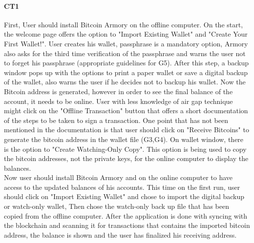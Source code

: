 \paragraph{CT1} 
First, User should install Bitcoin Armory on the offline computer. On the start, the welcome page offers the option to "Import Existing Wallet" and "Create Your First Wallet!". User creates his wallet, passphrase is a mandatory option, Armory also asks for the third time verification of the passphrase and warns the user not to forget his passphrase (appropriate guidelines for G5). After this step, a backup window pops up with the options to print a paper wallet or save a digital backup of the wallet, also warns the user if he decides not to backup his wallet. Now the Bitcoin address is generated, however in order to see the final balance of the account, it needs to be online. User with less knowledge of air gap technique might click on the "Offline Transaction" button that offers a short documentation of the steps to be taken to sign a transaction. One point that has not been mentioned in the documentation is that user should click on "Receive Bitcoins" to generate the bitcoin address in the wallet file (G3,G4). On wallet window, there is the option to "Create Watching-Only Copy". This option is being used to copy the bitcoin addresses, not the private keys, for the online computer to display the balances.\\
Now user should install Bitcoin Armory and \bitcoinclient on the online computer to have access to the updated balances of his accounts. This time on the first run, user should click on "Import Existing Wallet" and chose to import the digital backup or watch-only wallet, Then chose the watch-only back up file that has been copied from the offline computer. After the application is done with syncing with the blockchain and scanning it for transactions that contains the imported bitcoin address, the balance is shown and the user has finalized his receiving address.


